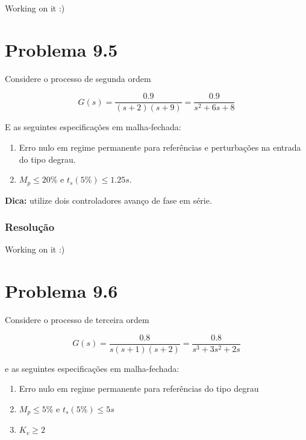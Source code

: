 \documentclass[
]{book}
\providecommand{\tightlist}{%
  \setlength{\itemsep}{0pt}\setlength{\parskip}{0pt}}
\theoremstyle{definition}
\theoremstyle{definition}
\theoremstyle{definition}
\theoremstyle{remark}
\begin{document}
Working on it :)

\hypertarget{problema-9.5}{%
\section*{Problema 9.5}\label{problema-9.5}}

Considere o processo de segunda ordem

\[
G(s) = \frac{0.9}{(s+2)(s+9)} = \frac{0.9}{s^2+6s+8}
\]

E as seguintes especificações em malha-fechada:

\begin{enumerate}
\def\labelenumi{\alph{enumi}.}
\tightlist
\item
  Erro nulo em regime permanente para referências e perturbações na entrada do tipo degrau.
\item
  \(M_p \leq 20\%\) e \(t_s(5\%)\leq1.25s\).
\end{enumerate}

\textbf{Dica:} utilize dois controladores avanço de fase em série.

\hypertarget{resoluuxe7uxe3o-32}{%
\subsubsection*{Resolução}\label{resoluuxe7uxe3o-32}}

Working on it :)

\hypertarget{problema-9.6}{%
\section*{Problema 9.6}\label{problema-9.6}}

Considere o processo de terceira ordem

\[
G(s) = \frac{0.8}{s(s+1)(s+2)} = \frac{0.8}{s^3+3s^2+2s}
\]

e as seguintes especificações em malha-fechada:

\begin{enumerate}
\def\labelenumi{\alph{enumi}.}
\tightlist
\item
  Erro nulo em regime permanente para referências do tipo degrau
\item
  \(M_p \leq 5\%\) e \(t_s(5\%)\leq5s\)
\item
  \(K_v\geq2\)
\end{enumerate}
\end{document}

